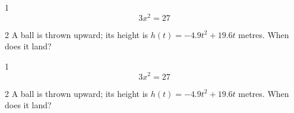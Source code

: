 \documentclass[11pt]{article}
\title{#1}\author{#2}\date{}%
\begin{document}

\begin{clproblem}{1}{}
\[
3x^{2} = 27
\]
\end{clproblem}

\begin{clproblem}{2}{}
A ball is thrown upward; its height is \(h(t) = -4.9t^{2} + 19.6t\) metres. When does it land?

\end{clproblem}

\clcutline
{}

\begin{clproblem}{1}{}
\[
3x^{2} = 27
\]
\end{clproblem}

\begin{clproblem}{2}{}
A ball is thrown upward; its height is \(h(t) = -4.9t^{2} + 19.6t\) metres. When does it land?

\end{clproblem}
\end{document}
